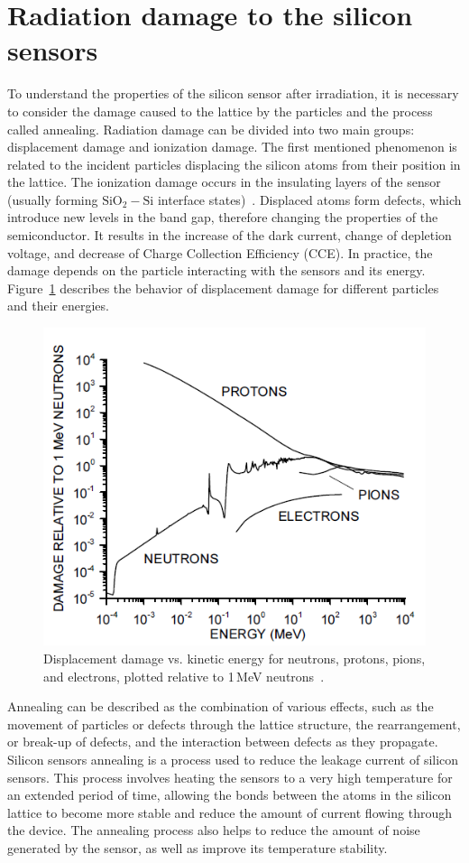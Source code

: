 \section{Radiation damage to the silicon sensors}
\label{silicon_damage}
To understand the properties of the silicon sensor after irradiation, it is necessary to consider the damage caused to the lattice by the particles and the process called annealing. Radiation damage can be divided into two main groups: displacement damage and ionization damage. The first mentioned phenomenon is related to the incident particles displacing the silicon atoms from their position in the lattice. The ionization damage occurs in the insulating layers of the sensor (usually forming $\mathrm{SiO_{2}-Si}$ interface states)~\cite{Moll:1999kv}. Displaced atoms form defects, which introduce new levels in the band gap, therefore changing the properties of the semiconductor. It results in the increase of the dark current, change of depletion voltage, and decrease of Charge Collection Efficiency (\gls{CCE}). In practice, the damage depends on the particle interacting with the sensors and its energy. Figure~\ref{fig_niel_si} describes the behavior of displacement damage for different particles and their energies.  
\begin{figure}[!h]
\centering
\includegraphics[width=0.7\columnwidth]{Chapter2/images/displacement_damage.png}
\caption{Displacement damage vs. kinetic energy for neutrons, protons, pions, and electrons,
plotted relative to 1\,MeV neutrons~\cite{Spieler}.}
\label{fig_niel_si}
\end{figure}

Annealing can be described as the combination of various effects, such as the movement of particles or defects through the lattice structure, the rearrangement, or break-up of defects, and the interaction between defects as they propagate. Silicon sensors annealing is a process used to reduce the leakage current of silicon sensors. This process involves heating the sensors to a very high temperature for an extended period of time, allowing the bonds between the atoms in the silicon lattice to become more stable and reduce the amount of current flowing through the device. The annealing process also helps to reduce the amount of noise generated by the sensor, as well as improve its temperature stability. \bigbreak

